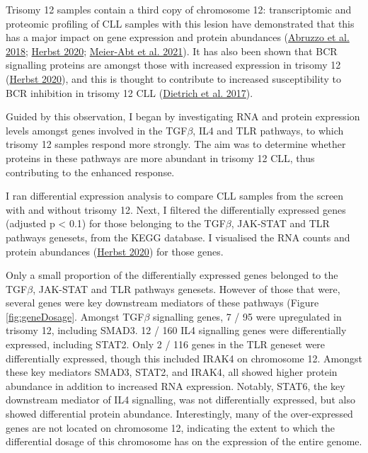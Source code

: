 \documentclass[11pt, a4paper, twosided]{book}
\begin{document}
Trisomy 12 samples contain a third copy of chromosome 12: transcriptomic and proteomic profiling of CLL samples with this lesion have demonstrated that this has a major impact on gene expression and protein abundances (\protect\hyperlink{ref-Abruzzo2018}{Abruzzo et al. 2018}; \protect\hyperlink{ref-HerbstThesis}{Herbst 2020}; \protect\hyperlink{ref-MeierAbt2021}{Meier-Abt et al. 2021}). It has also been shown that BCR signalling proteins are amongst those with increased expression in trisomy 12 (\protect\hyperlink{ref-HerbstThesis}{Herbst 2020}), and this is thought to contribute to increased susceptibility to BCR inhibition in trisomy 12 CLL (\protect\hyperlink{ref-JCIpaper}{Dietrich et al. 2017}).

Guided by this observation, I began by investigating RNA and protein expression levels amongst genes involved in the TGF\(\beta\), IL4 and TLR pathways, to which trisomy 12 samples respond more strongly. The aim was to determine whether proteins in these pathways are more abundant in trisomy 12 CLL, thus contributing to the enhanced response.

I ran differential expression analysis to compare CLL samples from the screen with and without trisomy 12. Next, I filtered the differentially expressed genes (adjusted p \textless{} 0.1) for those belonging to the TGF\(\beta\), JAK-STAT and TLR pathways genesets, from the KEGG database. I visualised the RNA counts and protein abundances (\protect\hyperlink{ref-HerbstThesis}{Herbst 2020}) for those genes.

Only a small proportion of the differentially expressed genes belonged to the TGF\(\beta\), JAK-STAT and TLR pathways genesets. However of those that were, several genes were key downstream mediators of these pathways (Figure \ref{fig:geneDosage}. Amongst TGF\(\beta\) signalling genes, 7 / 95 were upregulated in trisomy 12, including SMAD3. 12 / 160 IL4 signalling genes were differentially expressed, including STAT2. Only 2 / 116 genes in the TLR geneset were differentially expressed, though this included IRAK4 on chromosome 12. Amongst these key mediators SMAD3, STAT2, and IRAK4, all showed higher protein abundance in addition to increased RNA expression. Notably, STAT6, the key downstream mediator of IL4 signalling, was not differentially expressed, but also showed differential protein abundance. Interestingly, many of the over-expressed genes are not located on chromosome 12, indicating the extent to which the differential dosage of this chromosome has on the expression of the entire genome.
\end{document}
